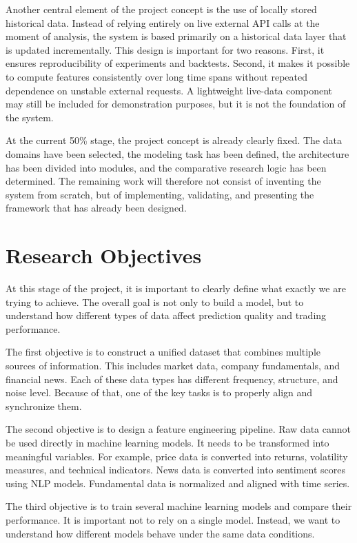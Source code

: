 \documentclass[12pt,a4paper]{article}
\begin{document}
Another central element of the project concept is the use of locally stored historical data. Instead of relying entirely on live external API calls at the moment of analysis, the system is based primarily on a historical data layer that is updated incrementally. This design is important for two reasons. First, it ensures reproducibility of experiments and backtests. Second, it makes it possible to compute features consistently over long time spans without repeated dependence on unstable external requests. A lightweight live-data component may still be included for demonstration purposes, but it is not the foundation of the system.

At the current 50\% stage, the project concept is already clearly fixed. The data domains have been selected, the modeling task has been defined, the architecture has been divided into modules, and the comparative research logic has been determined. The remaining work will therefore not consist of inventing the system from scratch, but of implementing, validating, and presenting the framework that has already been designed.

\newpage

\section{Research Objectives}

At this stage of the project, it is important to clearly define what exactly we are trying to achieve. The overall goal is not only to build a model, but to understand how different types of data affect prediction quality and trading performance.

The first objective is to construct a unified dataset that combines multiple sources of information. This includes market data, company fundamentals, and financial news. Each of these data types has different frequency, structure, and noise level. Because of that, one of the key tasks is to properly align and synchronize them.

The second objective is to design a feature engineering pipeline. Raw data cannot be used directly in machine learning models. It needs to be transformed into meaningful variables. For example, price data is converted into returns, volatility measures, and technical indicators. News data is converted into sentiment scores using NLP models. Fundamental data is normalized and aligned with time series.

The third objective is to train several machine learning models and compare their performance. It is important not to rely on a single model. Instead, we want to understand how different models behave under the same data conditions.
\end{document}
